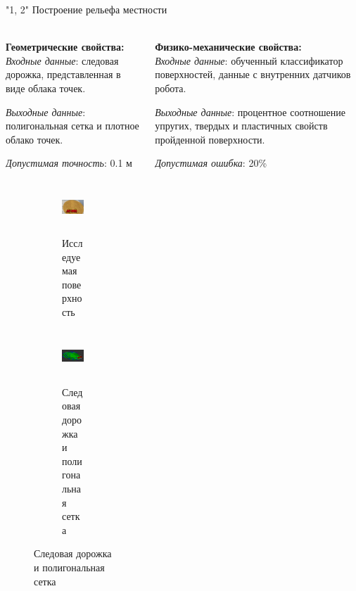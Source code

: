 \begin{frame}[t]{"1, 2" Построение рельефа местности}
    \framesubtitle{}
    \begin{columns}[T,onlytextwidth]
        \begin{column}{0.49\textwidth}
            \textbf{Геометрические свойства:}\\
            \textit{Входные данные}: следовая дорожка, представленная в виде облака точек.

            \textit{Выходные данные}: полигональная сетка и плотное облако точек.

            \textit{Допустимая точность}: 0.1 м
            \begin{figure}[H]
                \begin{subfigure}[t]{0.49\textwidth}
                    \centering\includegraphics[height=2cm,width=1\textwidth,keepaspectratio]{../images/slides/surface_research.png}
                    \caption{Исследуемая поверхность}
                \end{subfigure}
                \begin{subfigure}[t]{0.49\textwidth}
                    \centering\includegraphics[height=2cm,width=1\textwidth,keepaspectratio]{../images/slides/result_research.png}
                    \caption{Следовая дорожка и полигональная сетка}
                \end{subfigure}
            \end{figure}
        \end{column}
        \begin{column}{0.49\textwidth}
            \textbf{Физико-механические свойства:}\\
            \textit{Входные данные}: обученный классификатор поверхностей, данные с внутренних датчиков робота.

            \textit{Выходные данные}: процентное соотношение упругих, твердых и пластичных свойств пройденной поверхности.

            \textit{Допустимая ошибка}: 20\% 


\end{column}
\end{columns}
\end{frame}
